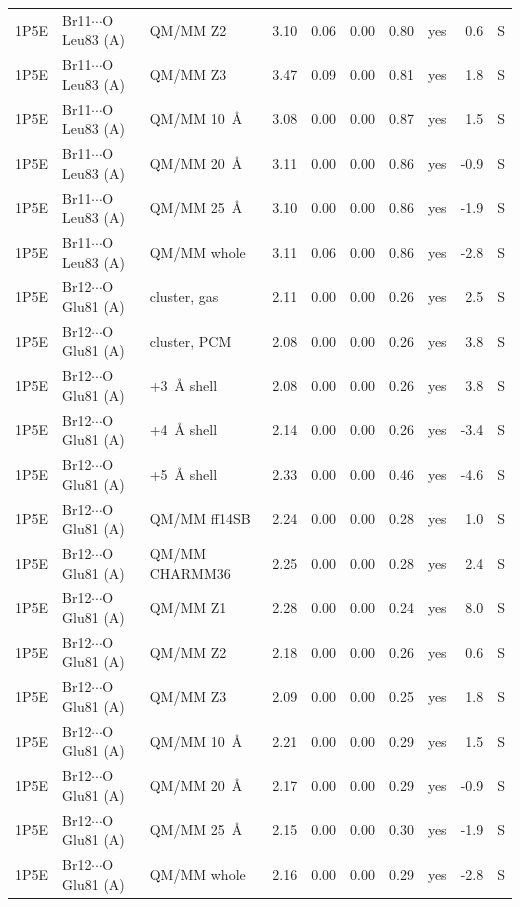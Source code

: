 \documentclass[journal=jcisd8,manuscript=suppinfo]{achemso}
\begin{document}
\begin{singlespace}
{\begin{longtable}{lllrrrrlrl}
1P5E & Br11$\cdots$O Leu83 (A) & QM/MM Z2 & 3.10 & 0.06 & 0.00 & 0.80 & yes & 0.6 & S\\
1P5E & Br11$\cdots$O Leu83 (A) & QM/MM Z3 & 3.47 & 0.09 & 0.00 & 0.81 & yes & 1.8 & S\\
1P5E & Br11$\cdots$O Leu83 (A) & QM/MM 10~\AA{} & 3.08 & 0.00 & 0.00 & 0.87 & yes & 1.5 & S\\
1P5E & Br11$\cdots$O Leu83 (A) & QM/MM 20~\AA{} & 3.11 & 0.00 & 0.00 & 0.86 & yes & -0.9 & S\\
1P5E & Br11$\cdots$O Leu83 (A) & QM/MM 25~\AA{} & 3.10 & 0.00 & 0.00 & 0.86 & yes & -1.9 & S\\
1P5E & Br11$\cdots$O Leu83 (A) & QM/MM whole & 3.11 & 0.06 & 0.00 & 0.86 & yes & -2.8 & S\\
1P5E & Br12$\cdots$O Glu81 (A) & cluster, gas & 2.11 & 0.00 & 0.00 & 0.26 & yes & 2.5 & S\\
1P5E & Br12$\cdots$O Glu81 (A) & cluster, PCM & 2.08 & 0.00 & 0.00 & 0.26 & yes & 3.8 & S\\
1P5E & Br12$\cdots$O Glu81 (A) & +3~\AA{} shell & 2.08 & 0.00 & 0.00 & 0.26 & yes & 3.8 & S\\
1P5E & Br12$\cdots$O Glu81 (A) & +4~\AA{} shell & 2.14 & 0.00 & 0.00 & 0.26 & yes & -3.4 & S\\
1P5E & Br12$\cdots$O Glu81 (A) & +5~\AA{} shell & 2.33 & 0.00 & 0.00 & 0.46 & yes & -4.6 & S\\
1P5E & Br12$\cdots$O Glu81 (A) & QM/MM ff14SB & 2.24 & 0.00 & 0.00 & 0.28 & yes & 1.0 & S\\
1P5E & Br12$\cdots$O Glu81 (A) & QM/MM CHARMM36 & 2.25 & 0.00 & 0.00 & 0.28 & yes & 2.4 & S\\
1P5E & Br12$\cdots$O Glu81 (A) & QM/MM Z1 & 2.28 & 0.00 & 0.00 & 0.24 & yes & 8.0 & S\\
1P5E & Br12$\cdots$O Glu81 (A) & QM/MM Z2 & 2.18 & 0.00 & 0.00 & 0.26 & yes & 0.6 & S\\
1P5E & Br12$\cdots$O Glu81 (A) & QM/MM Z3 & 2.09 & 0.00 & 0.00 & 0.25 & yes & 1.8 & S\\
1P5E & Br12$\cdots$O Glu81 (A) & QM/MM 10~\AA{} & 2.21 & 0.00 & 0.00 & 0.29 & yes & 1.5 & S\\
1P5E & Br12$\cdots$O Glu81 (A) & QM/MM 20~\AA{} & 2.17 & 0.00 & 0.00 & 0.29 & yes & -0.9 & S\\
1P5E & Br12$\cdots$O Glu81 (A) & QM/MM 25~\AA{} & 2.15 & 0.00 & 0.00 & 0.30 & yes & -1.9 & S\\
1P5E & Br12$\cdots$O Glu81 (A) & QM/MM whole & 2.16 & 0.00 & 0.00 & 0.29 & yes & -2.8 & S\\

\end{longtable}}
\end{singlespace}
\end{document}
